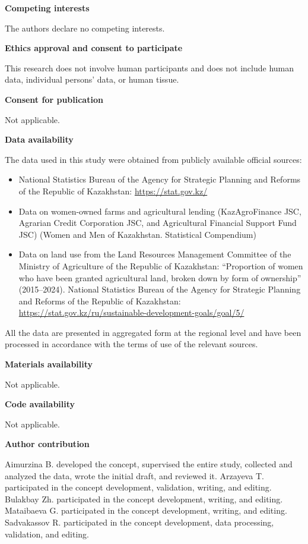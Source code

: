 ﻿\documentclass[pdflatex,sn-mathphys-ay]{sn-jnl}
\begin{document}
\medskip
\noindent\textbf{Competing interests}

The authors declare no competing interests.

\medskip
\noindent\textbf{Ethics approval and consent to participate}

This research does not involve human participants and does not include
human data, individual persons' data, or human tissue.

\medskip
\noindent\textbf{Consent for publication}

Not applicable.

\medskip
\noindent\textbf{Data availability}

The data used in this study were obtained from publicly available
official sources:

\begin{itemize}
\item National Statistics Bureau of the Agency for Strategic Planning
and Reforms of the Republic of Kazakhstan: \url{https://stat.gov.kz/}
\item Data on women-owned farms and agricultural lending
(KazAgroFinance JSC, Agrarian Credit Corporation JSC, and Agricultural
Financial Support Fund JSC) (Women and Men of Kazakhstan. Statistical
Compendium)
\item Data on land use from the Land Resources Management Committee of
the Ministry of Agriculture of the Republic of Kazakhstan: ``Proportion
of women who have been granted agricultural land, broken down by form of
ownership'' (2015--2024). National Statistics Bureau of the Agency for
Strategic Planning and Reforms of the Republic of Kazakhstan:
\url{https://stat.gov.kz/ru/sustainable-development-goals/goal/5/}
\end{itemize}

All the data are presented in aggregated form at the regional level and have
been processed in accordance with the terms of use of the relevant
sources.

\medskip
\noindent\textbf{Materials availability}

Not applicable.

\medskip
\noindent\textbf{Code availability}

Not applicable.

\medskip
\noindent\textbf{Author contribution}

Aimurzina B. developed the concept, supervised the entire study,
collected and analyzed the data, wrote the initial draft, and reviewed
it. Arzayeva T. participated in the concept development, validation,
writing, and editing. Bulakbay Zh. participated in the concept
development, writing, and editing. Mataibaeva G. participated in the
concept development, writing, and editing. Sadvakassov R. participated
in the concept development, data processing, validation, and editing.


\end{document}
